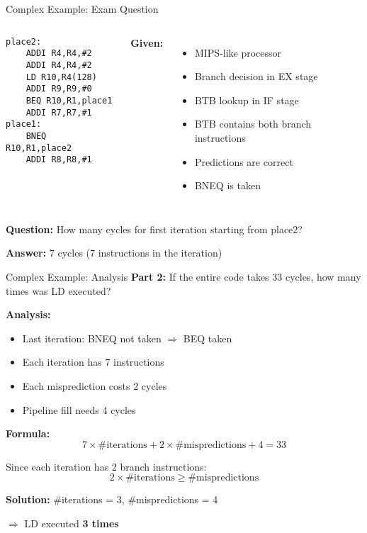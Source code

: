 \documentclass[aspectratio=169,12pt]{beamer}
\begin{document}
\begin{frame}[fragile]{Complex Example: Exam Question}
\begin{columns}
\begin{lstlisting}[language={[x86masm]Assembler}]
place2: 
    ADDI R4,R4,#2
    ADDI R4,R4,#2
    LD R10,R4(128)
    ADDI R9,R9,#0
    BEQ R10,R1,place1
    ADDI R7,R7,#1
place1: 
    BNEQ R10,R1,place2
    ADDI R8,R8,#1
\end{lstlisting}

\textbf{Given:}
\begin{itemize}
    \item MIPS-like processor
    \item Branch decision in EX stage
    \item BTB lookup in IF stage
    \item BTB contains both branch instructions
    \item Predictions are correct
    \item BNEQ is taken
\end{itemize}
\end{columns}

\vspace{0.3cm}
\textbf{Question:} How many cycles for first iteration starting from place2?

\textbf{Answer:} 7 cycles (7 instructions in the iteration)
\end{frame}

\begin{frame}{Complex Example: Analysis}
\textbf{Part 2:} If the entire code takes 33 cycles, how many times was LD executed?

\textbf{Analysis:}
\begin{itemize}
    \item Last iteration: BNEQ not taken $\Rightarrow$ BEQ taken
    \item Each iteration has 7 instructions
    \item Each misprediction costs 2 cycles
    \item Pipeline fill needs 4 cycles
\end{itemize}

\textbf{Formula:}
$$7 \times \text{\#iterations} + 2 \times \text{\#mispredictions} + 4 = 33$$

Since each iteration has 2 branch instructions:
$$2 \times \text{\#iterations} \geq \text{\#mispredictions}$$

\textbf{Solution:} \#iterations = 3, \#mispredictions = 4

$\Rightarrow$ LD executed \textbf{3 times}
\end{frame}
\end{document}
